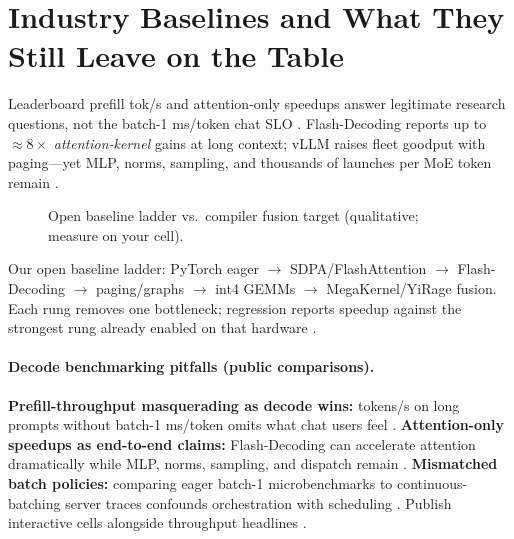 \section{Industry Baselines and What They Still Leave on the Table}
\label{sec:benchmark_gap}

Leaderboard prefill tok/s and attention-only speedups answer legitimate research questions, not the batch-1 ms/token chat SLO \citep{li2024llminferenceservin,kwon2023vllm}.
Flash-Decoding reports up to ${\approx}8\times$ \emph{attention-kernel} gains at long context; vLLM raises fleet goodput with paging---yet MLP, norms, sampling, and thousands of launches per MoE token remain \citep{dao2023flashdecoding,li2025llmpoweredautomate,taxbreak2026}.


\begin{figure}[t]
\centering
{}
\caption{Open baseline ladder vs.\ compiler fusion target (qualitative; measure on your cell).}
\label{fig:fusion_gap}
\end{figure}


Our open baseline ladder: PyTorch eager $\to$ SDPA/FlashAttention $\to$ Flash-Decoding $\to$ paging/graphs $\to$ int4 GEMMs $\to$ MegaKernel/YiRage fusion.
Each rung removes one bottleneck; regression reports speedup against the strongest rung already enabled on that hardware \citep{memoryfloor2026,arya2024apreliminaryperfor,yirage2026}.


\paragraph{Decode benchmarking pitfalls (public comparisons).}
\textbf{Prefill-throughput masquerading as decode wins:} tokens/s on long prompts without batch-1 ms/token omits what chat users feel \citep{li2024llminferenceservin,kwon2023vllm}.
\textbf{Attention-only speedups as end-to-end claims:} Flash-Decoding can accelerate attention dramatically while MLP, norms, sampling, and dispatch remain \citep{dao2023flashdecoding,memoryfloor2026}.
\textbf{Mismatched batch policies:} comparing eager batch-1 microbenchmarks to continuous-batching server traces confounds orchestration with scheduling \citep{taxbreak2026,chen2026towardshighgoodput}.
Publish interactive cells alongside throughput headlines \citep{memoryfloor2026,wang2025decoupledanalysiso}.

